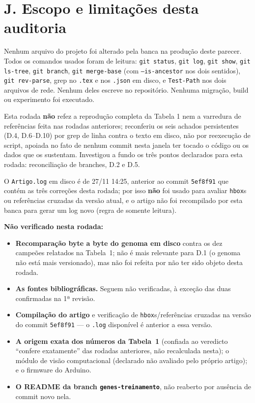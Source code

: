 \documentclass[11pt,a4paper]{article}
\begin{document}
\section*{J. Escopo e limitações desta auditoria}

Nenhum arquivo do projeto foi alterado pela banca na produção deste parecer. Todos os comandos usados
foram de leitura: \texttt{git status}, \texttt{git log}, \texttt{git show}, \texttt{git ls-tree},
\texttt{git branch}, \texttt{git merge-base} (com \texttt{--is-ancestor} nos dois sentidos),
\texttt{git rev-parse}, grep no \texttt{.tex} e nos \texttt{.json} em disco, e \texttt{Test-Path} nos
dois arquivos de rede. Nenhum deles escreve no repositório. Nenhuma migração, build ou experimento foi
executado.

Esta rodada \textbf{não} refez a reprodução completa da Tabela 1 nem a varredura de referências feita
nas rodadas anteriores; reconferiu os seis achados persistentes (D.4, D.6--D.10) por grep de linha
contra o texto em disco, não por reexecução de script, apoiada no fato de nenhum commit nesta janela
ter tocado o código ou os dados que os sustentam. Investigou a fundo os três pontos declarados para
esta rodada: reconciliação de branches, D.2 e D.5.

O \texttt{Artigo.log} em disco é de 27/11 14:25, anterior ao commit \texttt{5ef8f91} que contém as três
correções desta rodada; por isso \textbf{não} foi usado para avaliar \texttt{hbox}s ou referências
cruzadas da versão atual, e o artigo não foi recompilado por esta banca para gerar um log novo
(regra de somente leitura).

\textbf{Não verificado nesta rodada:}

\begin{itemize}
  \item \textbf{Recomparação byte a byte do genoma em disco} contra os dez campeões relatados na
  Tabela~1; não é mais relevante para D.1 (o genoma não está mais versionado), mas não foi refeita por
  não ter sido objeto desta rodada.
  \item \textbf{As fontes bibliográficas.} Seguem não verificadas, à exceção das duas confirmadas na
  1ª revisão.
  \item \textbf{Compilação do artigo} e verificação de \texttt{hbox}s/referências cruzadas na versão
  do commit \texttt{5ef8f91} --- o \texttt{.log} disponível é anterior a essa versão.
  \item \textbf{A origem exata dos números da Tabela~1} (confiada ao veredicto ``confere exatamente''
  das rodadas anteriores, não recalculada nesta); o módulo de visão computacional (declarado não
  avaliado pelo próprio artigo); e o firmware do Arduino.
  \item \textbf{O README da branch \texttt{genes-treinamento}}, não reaberto por ausência de commit
  novo nela.
\end{itemize}
\end{document}
